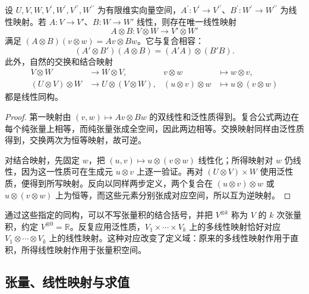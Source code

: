 \begin{proposition}\label{b1:prop:app-b-tensor-maps}
设 \(U,V,W,V^{\prime},W^{\prime},V^{\prime\prime},W^{\prime\prime}\) 为有限维实向量空间，\(A^{\prime}:V^{\prime}\to V^{\prime\prime}\)、\(B^{\prime}:W^{\prime}\to W^{\prime\prime}\) 为线性映射。若 \(A:V\rightarrow V'\)、\(B:W\rightarrow W'\) 线性，则存在唯一线性映射
\[
 A\otimes B:V\otimes W\longrightarrow V'\otimes W'
\]
满足 \((A\otimes B)(v\otimes w)=Av\otimes Bw\)。它与复合相容：
\[
 (A'\otimes B')(A\otimes B)=(A'A)\otimes(B'B).
\]
此外，自然的交换和结合映射
\[
 \begin{aligned}
 V\otimes W&\longrightarrow W\otimes V,
     &v\otimes w&\longmapsto w\otimes v,\\
 (U\otimes V)\otimes W&\longrightarrow U\otimes(V\otimes W),
     &(u\otimes v)\otimes w&\longmapsto u\otimes(v\otimes w)
 \end{aligned}
\]
都是线性同构。
\end{proposition}
\begin{proof}
第一映射由 \((v,w)\mapsto Av\otimes Bw\) 的双线性和泛性质得到。复合公式两边在每个纯张量上相等，而纯张量张成全空间，因此两边相等。交换映射同样由泛性质得到，交换两次为恒等映射，故可逆。

对结合映射，先固定 \(w\)，把 \((u,v)\mapsto u\otimes(v\otimes w)\) 线性化；所得映射对 \(w\) 仍线性，因为这一性质可在生成元 \(u\otimes v\) 上逐一验证。再对 \((U\otimes V)\times W\) 使用泛性质，便得到所写映射。反向以同样两步定义，两个复合在 \((u\otimes v)\otimes w\) 或 \(u\otimes(v\otimes w)\) 上为恒等，而这些元素分别张成对应空间，所以互为逆映射。
\end{proof}

通过这些指定的同构，可以不写张量积的结合括号，并把
\(V^{\otimes k}\) 称为 \(V\) 的 \(k\) 次张量积，约定 \(V^{\otimes0}=\mathbb R\)。反复应用泛性质，\(V_1\times\cdots\times V_k\) 上的多线性映射恰好对应 \(V_1\otimes\cdots\otimes V_k\) 上的线性映射。这种对应改变了定义域：原来的多线性映射作用于直积，所得线性映射作用于张量积空间。

\subsection{张量、线性映射与求值}
\label{b1:subsec:B10103}

